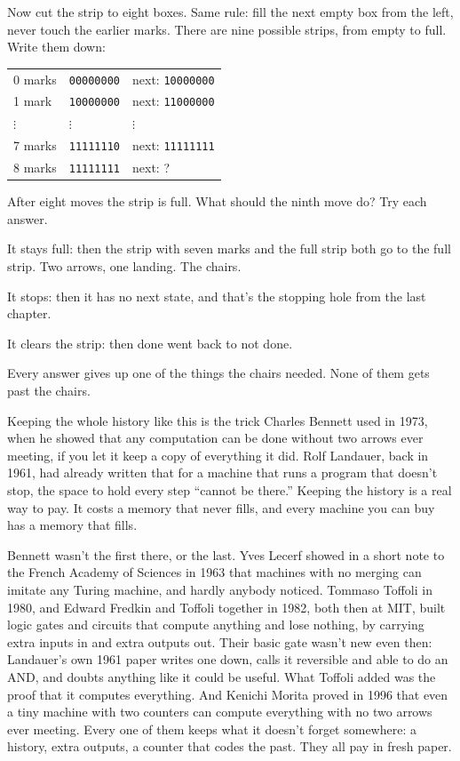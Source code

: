 \documentclass[11pt,twoside]{article}
\theoremstyle{thielethm}
\theoremstyle{thieledef}
\theoremstyle{thieledef}
\theoremstyle{thieledef}
\theoremstyle{thielethm}
\theoremstyle{thieleobs}
\theoremstyle{thielethm}
\begin{document}
Now cut the strip to eight boxes. Same rule: fill the next empty box from the left, never touch the earlier marks. There are nine possible strips, from empty to full. Write them down:

\begin{center}
\small
\begin{tabular}{@{}lll@{}}
0 marks & \texttt{00000000} & next: \texttt{10000000}\\
1 mark & \texttt{10000000} & next: \texttt{11000000}\\
$\vdots$ & $\vdots$ & $\vdots$\\
7 marks & \texttt{11111110} & next: \texttt{11111111}\\
8 marks & \texttt{11111111} & next: ?
\end{tabular}
\end{center}

After eight moves the strip is full. What should the ninth move do? Try each answer.

It stays full: then the strip with seven marks and the full strip both go to the full strip. Two arrows, one landing. The chairs.

It stops: then it has no next state, and that's the stopping hole from the last chapter.

It clears the strip: then done went back to not done.

Every answer gives up one of the things the chairs needed. None of them gets past the chairs.

Keeping the whole history like this is the trick Charles Bennett used in 1973, when he showed that any computation can be done without two arrows ever meeting, if you let it keep a copy of everything it did. Rolf Landauer, back in 1961, had already written that for a machine that runs a program that doesn't stop, the space to hold every step ``cannot be there.'' Keeping the history is a real way to pay. It costs a memory that never fills, and every machine you can buy has a memory that fills.

Bennett wasn't the first there, or the last. Yves Lecerf showed in a short note to the French Academy of Sciences in 1963 that machines with no merging can imitate any Turing machine, and hardly anybody noticed. Tommaso Toffoli in 1980, and Edward Fredkin and Toffoli together in 1982, both then at MIT, built logic gates and circuits that compute anything and lose nothing, by carrying extra inputs in and extra outputs out. Their basic gate wasn't new even then: Landauer's own 1961 paper writes one down, calls it reversible and able to do an AND, and doubts anything like it could be useful. What Toffoli added was the proof that it computes everything. And Kenichi Morita proved in 1996 that even a tiny machine with two counters can compute everything with no two arrows ever meeting. Every one of them keeps what it doesn't forget somewhere: a history, extra outputs, a counter that codes the past. They all pay in fresh paper.
\end{document}
